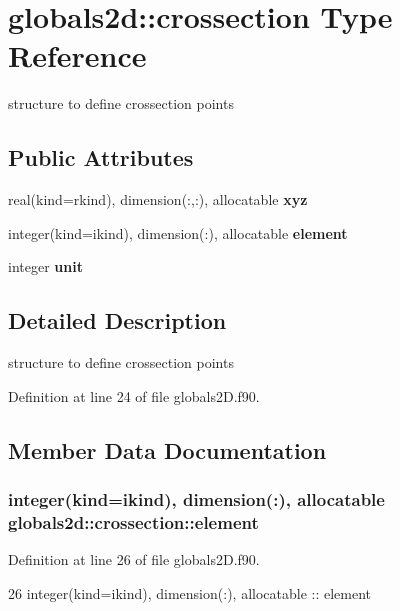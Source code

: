 \section{globals2d\+:\+:crossection Type Reference}
\label{structglobals2d_1_1crossection}


structure to define crossection points  


\subsection*{Public Attributes}
\begin{DoxyCompactItemize}
\item 
real(kind=rkind), dimension(\+:,\+:), allocatable {\bf xyz}
\item 
integer(kind=ikind), dimension(\+:), allocatable {\bf element}
\item 
integer {\bf unit}
\end{DoxyCompactItemize}


\subsection{Detailed Description}
structure to define crossection points 

Definition at line 24 of file globals2\+D.\+f90.



\subsection{Member Data Documentation}
\subsubsection[{element}]{\setlength{\rightskip}{0pt plus 5cm}integer(kind=ikind), dimension(\+:), allocatable globals2d\+::crossection\+::element}\label{structglobals2d_1_1crossection_aba7afdf122b88844c7412125ae282f9b}


Definition at line 26 of file globals2\+D.\+f90.


\begin{DoxyCode}
26     \textcolor{keywordtype}{integer(kind=ikind)}, \textcolor{keywordtype}{dimension(:)}, \textcolor{keywordtype}{allocatable} :: element
\end{DoxyCode}
